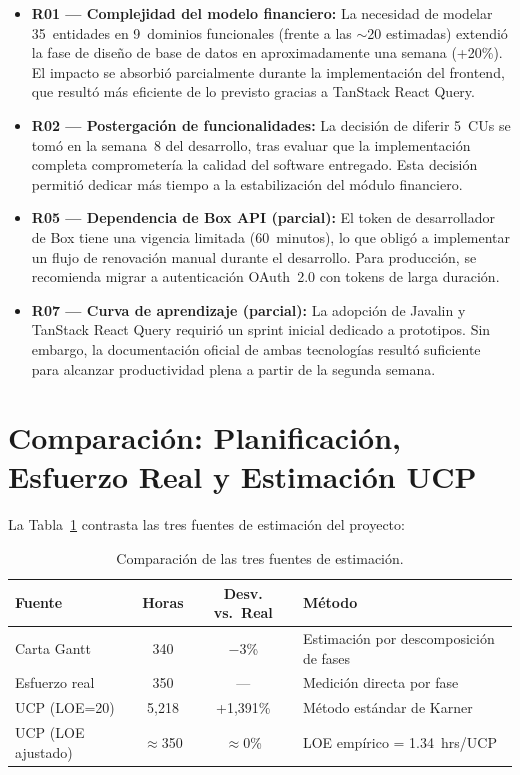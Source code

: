 \begin{itemize}
    \item \textbf{R01 --- Complejidad del modelo financiero:} La necesidad de modelar 35~entidades en 9~dominios funcionales (frente a las $\sim$20 estimadas) extendió la fase de diseño de base de datos en aproximadamente una semana (+20\%). El impacto se absorbió parcialmente durante la implementación del frontend, que resultó más eficiente de lo previsto gracias a TanStack React Query.

    \item \textbf{R02 --- Postergación de funcionalidades:} La decisión de diferir 5~CUs se tomó en la semana~8 del desarrollo, tras evaluar que la implementación completa comprometería la calidad del software entregado. Esta decisión permitió dedicar más tiempo a la estabilización del módulo financiero.

    \item \textbf{R05 --- Dependencia de Box API (parcial):} El token de desarrollador de Box tiene una vigencia limitada (60~minutos), lo que obligó a implementar un flujo de renovación manual durante el desarrollo. Para producción, se recomienda migrar a autenticación OAuth~2.0 con tokens de larga duración.

    \item \textbf{R07 --- Curva de aprendizaje (parcial):} La adopción de Javalin y TanStack React Query requirió un sprint inicial dedicado a prototipos. Sin embargo, la documentación oficial de ambas tecnologías resultó suficiente para alcanzar productividad plena a partir de la segunda semana.
\end{itemize}

\section{Comparación: Planificación, Esfuerzo Real y Estimación UCP}

La Tabla~\ref{tab:comparacion-retro} contrasta las tres fuentes de estimación del proyecto:

\begin{table}[H]
\centering
\begin{tabular}{|p{}|c|c|p{}|}
\hline
\textbf{Fuente} & \textbf{Horas} & \textbf{Desv. vs.\ Real} & \textbf{Método} \\
\hline
Carta Gantt & 340 & $-$3\% & Estimación por descomposición de fases \\
\hline
Esfuerzo real & 350 & --- & Medición directa por fase \\
\hline
UCP (LOE=20) & 5{,}218 & +1{,}391\% & Método estándar de Karner \\
\hline
UCP (LOE ajustado) & $\approx$350 & $\approx$0\% & LOE empírico = 1.34~hrs/UCP \\
\hline
\end{tabular}
\caption{Comparación de las tres fuentes de estimación.}
\label{tab:comparacion-retro}
\end{table}

